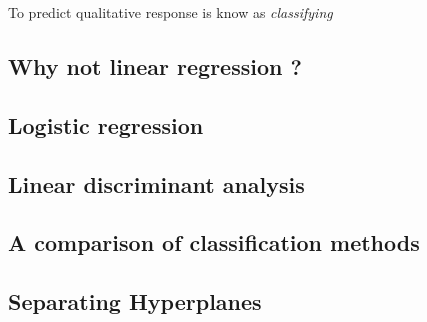 To predict qualitative response is know as \emph{classifying}
%
\subsection{Why not linear regression ?}

\subsection{Logistic regression}

\subsection{Linear discriminant analysis}

\subsection{A comparison of classification methods}

\subsection{Separating Hyperplanes}

%
